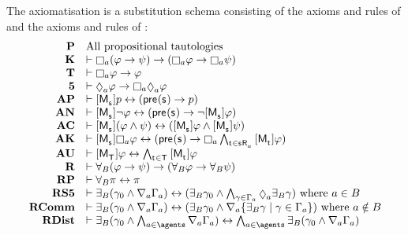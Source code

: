 \begin{definition}\label{raml-s5-axiomatisation}
The axiomatisation \axiomRamlS{} is a substitution schema consisting of the axioms and rules of \axiomAmlS{} and the axioms and rules of \axiomRmlS{}:
$$
\begin{array}{rl}
    {\bf P}     & \text{All propositional tautologies}\\
    {\bf K}     & \proves \necessaryA (\phi \implies \psi) \implies (\necessaryA \phi \implies \necessaryA \psi)\\
    {\bf T}     & \proves \necessaryA \phi \implies \phi\\
    {\bf 5}     & \proves \possibleA \phi \implies \necessaryA \possibleA \phi\\
    {\bf AP} & \proves \actionA{\aPModel{\aStateS}} \atomP \iff (\aPrecondition(\aStateS) \implies \atomP)\\
    {\bf AN} & \proves \actionA{\aPModel{\aStateS}} \lnot \phi \iff (\aPrecondition(\aStateS) \implies \lnot \actionA{\aPModel{\aStateS}} \phi)\\
    {\bf AC} & \proves \actionA{\aPModel{\aStateS}} (\phi \land \psi) \iff (\actionA{\aPModel{\aStateS}} \phi \land \actionA{\aPModel{\aStateS}} \psi)\\
    {\bf AK} & \proves \actionA{\aPModel{\aStateS}} \necessaryA \phi \iff (\aPrecondition(\aStateS) \implies \necessaryA \bigwedge_{\aStateT \in \aSuccessorsA{\aStateS}} \actionA{\aPModel{\aStateT}} \phi)\\
    {\bf AU} & \proves \actionA{\aPModel{\aStatesT}} \phi \iff \bigwedge_{\aStateT \in \aStatesT} \actionA{\aPModel{\aStateT}} \phi\\
    {\bf R} & \proves \allrefsBs (\phi \implies \psi) \implies (\allrefsBs \phi \implies \allrefsBs \psi)\\
    {\bf RP} & \proves \allrefsBs \pi \iff \pi\\
    {\bf RS5} & \proves \somerefsBs (\gamma_0 \land \coversA \Gamma_\agentA) \iff (\somerefsBs \gamma_0 \land \bigwedge_{\gamma \in \Gamma_\agentA} \possibleA \somerefsBs \gamma) \text{ where } \agentA \in \agentsB\\
    {\bf RComm} & \proves \somerefsBs (\gamma_0 \land \coversA \Gamma_\agentA) \iff (\somerefsBs \gamma_0 \land \coversA \{\somerefsBs \gamma \mid \gamma \in \Gamma_\agentA\}) \text{ where } \agentA \notin \agentsB\\
    {\bf RDist} & \proves \somerefsBs (\gamma_0 \land \bigwedge_{\agentA \in \agents} \coversA \Gamma_\agentA) \iff \bigwedge_{\agentA \in \agents} \somerefsBs (\gamma_0 \land \coversA \Gamma_\agentA)\\

\end{array}$$
\end{definition}
